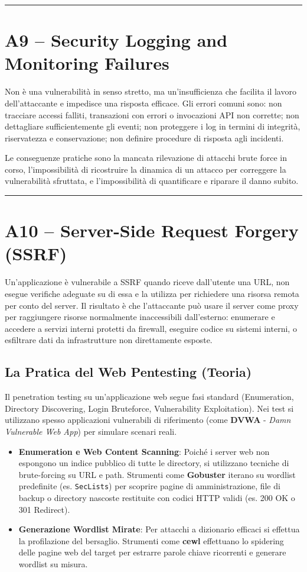 \documentclass[12pt, a4paper]{report}
\begin{document}
\noindent\rule{\textwidth}{0.4pt}

\section{A9 – Security Logging and Monitoring Failures}

Non è una vulnerabilità in senso stretto, ma un'insufficienza che facilita il lavoro dell'attaccante e impedisce una risposta efficace. Gli errori comuni sono: non tracciare accessi falliti, transazioni con errori o invocazioni API non corrette; non dettagliare sufficientemente gli eventi; non proteggere i log in termini di integrità, riservatezza e conservazione; non definire procedure di risposta agli incidenti.

Le conseguenze pratiche sono la mancata rilevazione di attacchi brute force in corso, l'impossibilità di ricostruire la dinamica di un attacco per correggere la vulnerabilità sfruttata, e l'impossibilità di quantificare e riparare il danno subito.

\noindent\rule{\textwidth}{0.4pt}

\section{A10 – Server-Side Request Forgery (SSRF)}

Un'applicazione è vulnerabile a SSRF quando riceve dall'utente una URL, non esegue verifiche adeguate su di essa e la utilizza per richiedere una risorsa remota per conto del server. Il risultato è che l'attaccante può usare il server come proxy per raggiungere risorse normalmente inaccessibili dall'esterno: enumerare e accedere a servizi interni protetti da firewall, eseguire codice su sistemi interni, o esfiltrare dati da infrastrutture non direttamente esposte.

\subsection{La Pratica del Web Pentesting (Teoria)}
Il penetration testing su un'applicazione web segue fasi standard (Enumeration, Directory Discovering, Login Bruteforce, Vulnerability Exploitation). Nei test si utilizzano spesso applicazioni vulnerabili di riferimento (come \textbf{DVWA} - \textit{Damn Vulnerable Web App}) per simulare scenari reali.

\begin{itemize}
	\item \textbf{Enumeration e Web Content Scanning}: Poiché i server web non espongono un indice pubblico di tutte le directory, si utilizzano tecniche di brute-forcing su URL e path. Strumenti come \textbf{Gobuster} iterano su wordlist predefinite (es. \texttt{SecLists}) per scoprire pagine di amministrazione, file di backup o directory nascoste restituite con codici HTTP validi (es. 200 OK o 301 Redirect).
	\item \textbf{Generazione Wordlist Mirate}: Per attacchi a dizionario efficaci si effettua la profilazione del bersaglio. Strumenti come \textbf{cewl} effettuano lo spidering delle pagine web del target per estrarre parole chiave ricorrenti e generare wordlist su misura.
\end{itemize}
\end{document}
